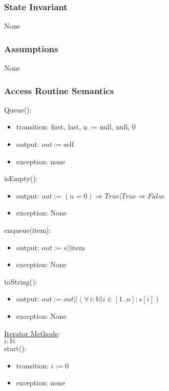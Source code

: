 \documentclass[12pt]{article}
\begin{document}
\subsubsection* {State Invariant}

None

\subsubsection* {Assumptions}

None

\subsubsection* {Access Routine Semantics}

\noindent Queue():
\begin{itemize}
\item transition: first, last, n := null, null, 0
\item output: $out := \mbox{self}$
\item exception: none
\end{itemize}

\noindent isEmpty():
\begin{itemize}
\item output: $out := (n = 0) \Rightarrow True | True \Rightarrow False$
\item exception: None
\end{itemize}

\noindent enqueue(item):
\begin{itemize}
\item output: $out := s || \mbox{item}$
\item exception: None
\end{itemize}

\noindent toString():
\begin{itemize}
\item output: $out := out || (\forall\, i: \mathbb{N}| i\in[1..n] : s[i])$
\item exception: None
\end{itemize}

\medskip

\noindent \underline{Iterator Methods}:\\

$i: \mathbb{N}$\\

\noindent start():
\begin{itemize}
\item transition: $i := 0$
\item exception: none
\end{itemize}
\end{document}
